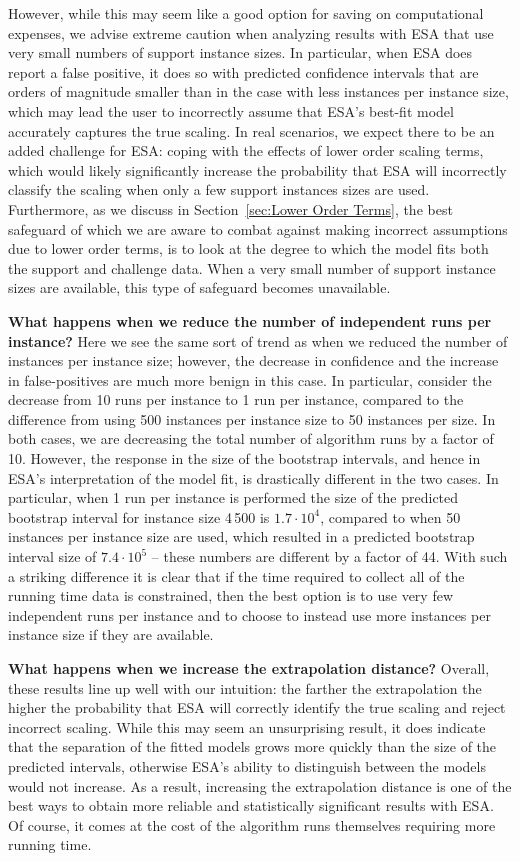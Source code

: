 \documentclass[aic]{iosart2x}
\begin{document}
However, while this may seem like a good option for saving on computational expenses, we advise extreme caution when analyzing results with ESA that use very small numbers of support instance sizes. In particular, when ESA does report a false positive, it does so with predicted confidence intervals that are orders of magnitude smaller than in the case with less instances per instance size, which may lead the user to incorrectly assume that ESA's best-fit model accurately captures the true scaling. In real scenarios, we expect there to be an added challenge for ESA: coping with the effects of lower order scaling terms, which would likely significantly increase the probability that ESA will incorrectly classify the scaling when only a few support instances sizes are used. Furthermore, as we discuss in Section~\ref{sec:Lower Order Terms}, the best safeguard of which we are aware to combat against making incorrect assumptions due to lower order terms, is to look at the degree to which the model fits both the support and challenge data. When a very small number of support instance sizes are available, this type of safeguard becomes unavailable. 

\textbf{What happens when we reduce the number of independent runs per instance?}
Here we see the same sort of trend as when we reduced the number of instances per instance size; however, the decrease in confidence and the increase in false-positives are much more benign in this case. In particular, consider the decrease from 10 runs per instance to 1 run per instance, compared to the difference from using 500 instances per instance size to 50 instances per size. In both cases, we are decreasing the total number of algorithm runs by a factor of 10. However, the response in the size of the bootstrap intervals, and hence in ESA's interpretation of the model fit, is drastically different in the two cases. In particular, when 1 run per instance is performed the size of the predicted bootstrap interval for instance size 4\,500 is $1.7\cdot 10^4$, compared to when 50 instances per instance size are used, which resulted in a predicted bootstrap interval size of $7.4\cdot 10^5$ -- these numbers are different by a factor of 44. With such a striking difference it is clear that if the time required to collect all of the running time data is constrained, then the best option is to use very few independent runs per instance and to choose to instead use more instances per instance size if they are available.

\textbf{What happens when we increase the extrapolation distance?}
Overall, these results line up well with our intuition: the farther the extrapolation the higher the probability that ESA will correctly identify the true scaling and reject incorrect scaling. While this may seem an unsurprising result, it does indicate that the separation of the fitted models grows more quickly than the size of the predicted intervals, otherwise ESA's ability to distinguish between the models would not increase. As a result, increasing the extrapolation distance is one of the best ways to obtain more reliable and statistically significant results with ESA. Of course, it comes at the cost of the algorithm runs themselves requiring more running time. 
\end{document}
